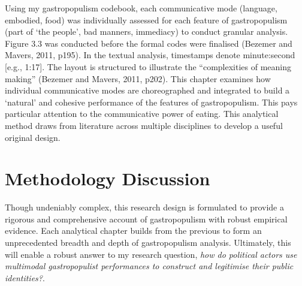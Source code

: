 \documentclass[a4paper, nobind]{templates/ociamthesis}
\begin{document}
Using my gastropopulism codebook, each communicative mode (language, embodied, food) was individually assessed for each feature of gastropopulism (part of `the people', bad manners, immediacy) to conduct granular analysis. Figure 3.3 was conducted before the formal codes were finalised (Bezemer and Mavers, 2011, p195). In the textual analysis, timestamps denote minute:second {[}e.g., 1:17{]}. The layout is structured to illustrate the ``complexities of meaning making'' (Bezemer and Mavers, 2011, p202). This chapter examines how individual communicative modes are choreographed and integrated to build a `natural' and cohesive performance of the features of gastropopulism. This pays particular attention to the communicative power of eating. This analytical method draws from literature across multiple disciplines to develop a useful original design.

\hypertarget{methodology-discussion}{%
\section*{Methodology Discussion}\label{methodology-discussion}}

Though undeniably complex, this research design is formulated to provide a rigorous and comprehensive account of gastropopulism with robust empirical evidence. Each analytical chapter builds from the previous to form an unprecedented breadth and depth of gastropopulism analysis. Ultimately, this will enable a robust answer to my research question, \emph{how do political actors use multimodal gastropopulist performances to construct and legitimise their public identities?}.

\end{document}
